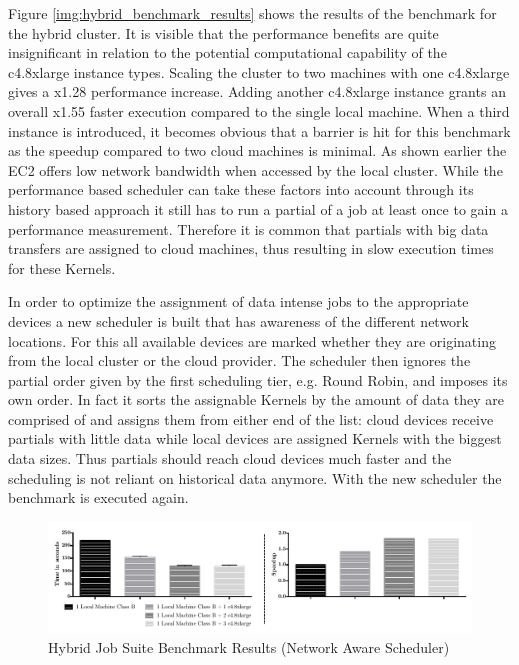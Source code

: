 Figure \ref{img:hybrid_benchmark_results} shows the results of the benchmark for the hybrid cluster. It is visible that the performance benefits are quite insignificant in relation to the potential computational capability of the c4.8xlarge instance types. Scaling the cluster to two machines with one c4.8xlarge gives a x1.28 performance increase. Adding another c4.8xlarge instance grants an overall x1.55 faster execution compared to the single local machine. When a third instance is introduced, it becomes obvious that a barrier is hit for this benchmark as the speedup compared to two cloud machines is minimal. As shown earlier the EC2 offers low network bandwidth when accessed by the local cluster. While the performance based scheduler can take these factors into account through its history based approach it still has to run a partial of a job at least once to gain a performance measurement. Therefore it is common that partials with big data transfers are assigned to cloud machines, thus resulting in slow execution times for these Kernels. 

In order to optimize the assignment of data intense jobs to the appropriate devices a new scheduler is built that has awareness of the different network locations. For this all available devices are marked whether they are originating from the local cluster or the cloud provider. The scheduler then ignores the partial order given by the first scheduling tier, e.g. Round Robin, and imposes its own order. In fact it sorts the assignable Kernels by the amount of data they are comprised of and assigns them from either end of the list: cloud devices receive partials with little data while local devices are assigned Kernels with the biggest data sizes. Thus partials should reach cloud devices much faster and the scheduling is not reliant on historical data anymore. With the new scheduler the benchmark is executed again.

\begin{figure}[H]	
	\includegraphics[width=1.0\textwidth]{images/hybrid_full_benchmark_network_based.pdf}
	\centering
	\caption{Hybrid Job Suite  Benchmark Results (Network Aware Scheduler)}
	\label{img:hybrid_benchmark_results_network_aware}
\end{figure}

